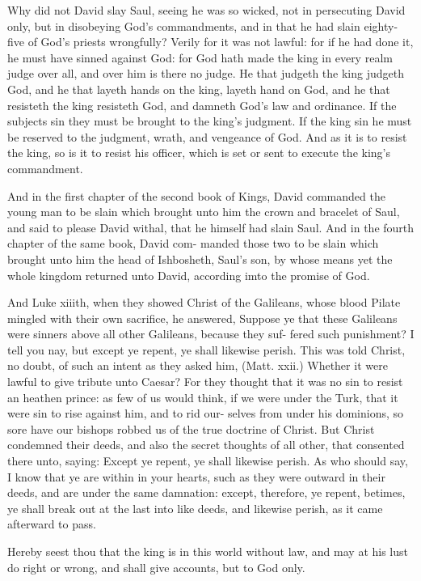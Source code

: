 \documentclass{custom}
\begin{document}
Why did not David slay Saul, seeing he was so wicked,
not in persecuting David only, but in disobeying God's
commandments, and in that he had slain eighty-five of 
God's priests wrongfully? Verily for it was not lawful:
for if he had done it, he must have sinned against God:
for God hath made the king in every realm judge over 
all, and over him is there no judge. He that judgeth the 
king judgeth God, and he that layeth hands on the king, 
layeth hand on God, and he that resisteth the king resisteth
God, and damneth God's law and ordinance. If the 
subjects sin they must be brought to the king's judgment. 
If the king sin he must be reserved to the judgment, 
wrath, and vengeance of God. And as it is to resist the 
king, so is it to resist his officer, which is set or sent to 
execute the king's commandment. 

And in the first chapter of the second book of Kings, 
David commanded the young man to be slain which 
brought unto him the crown and bracelet of Saul, and said 
to please David withal, that he himself had slain Saul.
And in the fourth chapter of the same book, David com- 
manded those two to be slain which brought unto him the 
head of Ishbosheth, Saul's son, by whose means yet the
whole kingdom returned unto David, according imto the 
promise of God.

And Luke xiiith, when they showed Christ of the
Galileans, whose blood Pilate mingled with their own 
sacrifice, he answered, Suppose ye that these Galileans 
were sinners above all other Galileans, because they suf- 
fered such punishment? I tell you nay, but except ye 
repent, ye shall likewise perish. This was told Christ, 
no doubt, of such an intent as they asked him, (Matt.
xxii.) Whether it were lawful to give tribute unto Caesar?
For they thought that it was no sin to resist an heathen 
prince: as few of us would think, if we were under the 
Turk, that it were sin to rise against him, and to rid our- 
selves from under his dominions, so sore have our bishops 
robbed us of the true doctrine of Christ. But Christ 
condemned their deeds, and also the secret thoughts of 
all other, that consented there unto, saying: Except ye 
repent, ye shall likewise perish. As who should say, I 
know that ye are within in your hearts, such as they were 
outward in their deeds, and are under the same damnation:
except, therefore, ye repent, betimes, ye shall break out 
at the last into like deeds, and likewise perish, as it came 
afterward to pass. 

Hereby seest thou that the king is in this world without 
law, and may at his lust do right or wrong, and shall give 
accounts, but to God only. 
\end{document}
